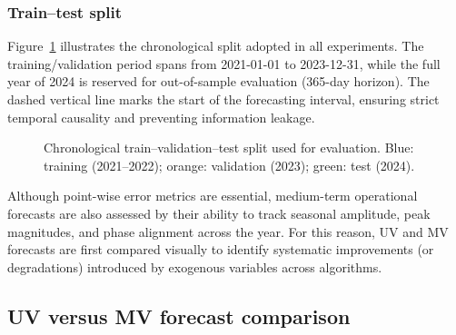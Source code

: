 \subsubsection{Train--test split}
Figure~\ref{fig:split_all} illustrates the chronological split adopted in all experiments. The training/validation period spans from 2021-01-01 to 2023-12-31, while the full year of 2024 is reserved for out-of-sample evaluation (365-day horizon). The dashed vertical line marks the start of the forecasting interval, ensuring strict temporal causality and preventing information leakage.

\begin{figure}[!h]
\centering
\begin{subfigure}[t]{\columnwidth}
    \centering
    
\end{subfigure}\par\vspace{0.15cm}
\begin{subfigure}[t]{\columnwidth}
    \centering
    
\end{subfigure}\par\vspace{0.15cm}
\begin{subfigure}[t]{\columnwidth}
    \centering
    
\end{subfigure}
\caption{Chronological train--validation--test split used for evaluation. Blue: training (2021--2022); orange: validation (2023); green: test (2024).}
\label{fig:split_all}
\end{figure}

Although point-wise error metrics are essential, medium-term operational forecasts are also assessed by their ability to track seasonal amplitude, peak magnitudes, and phase alignment across the year. For this reason, UV and MV forecasts are first compared visually to identify systematic improvements (or degradations) introduced by exogenous variables across algorithms.

\subsection{UV versus MV forecast comparison}
\label{subsec:results_uv_mv_visual}

